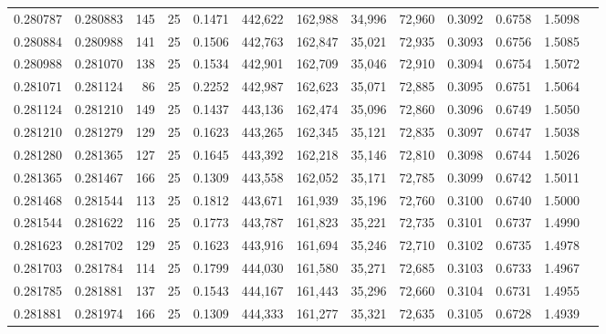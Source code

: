 \begin{tabular}{rrrrrrrrrrrrr}
0.280787 & 0.280883 &   145 &  25 &                                     0.1471 & 442,622 & 162,988 &  34,996 &  72,960 & 0.3092 & 0.6758 & 1.5098 \\
0.280884 & 0.280988 &   141 &  25 &                                     0.1506 & 442,763 & 162,847 &  35,021 &  72,935 & 0.3093 & 0.6756 & 1.5085 \\
0.280988 & 0.281070 &   138 &  25 &                                     0.1534 & 442,901 & 162,709 &  35,046 &  72,910 & 0.3094 & 0.6754 & 1.5072 \\
0.281071 & 0.281124 &    86 &  25 &                                     0.2252 & 442,987 & 162,623 &  35,071 &  72,885 & 0.3095 & 0.6751 & 1.5064 \\
0.281124 & 0.281210 &   149 &  25 &                                     0.1437 & 443,136 & 162,474 &  35,096 &  72,860 & 0.3096 & 0.6749 & 1.5050 \\
0.281210 & 0.281279 &   129 &  25 &                                     0.1623 & 443,265 & 162,345 &  35,121 &  72,835 & 0.3097 & 0.6747 & 1.5038 \\
0.281280 & 0.281365 &   127 &  25 &                                     0.1645 & 443,392 & 162,218 &  35,146 &  72,810 & 0.3098 & 0.6744 & 1.5026 \\
0.281365 & 0.281467 &   166 &  25 &                                     0.1309 & 443,558 & 162,052 &  35,171 &  72,785 & 0.3099 & 0.6742 & 1.5011 \\
0.281468 & 0.281544 &   113 &  25 &                                     0.1812 & 443,671 & 161,939 &  35,196 &  72,760 & 0.3100 & 0.6740 & 1.5000 \\
0.281544 & 0.281622 &   116 &  25 &                                     0.1773 & 443,787 & 161,823 &  35,221 &  72,735 & 0.3101 & 0.6737 & 1.4990 \\
0.281623 & 0.281702 &   129 &  25 &                                     0.1623 & 443,916 & 161,694 &  35,246 &  72,710 & 0.3102 & 0.6735 & 1.4978 \\
0.281703 & 0.281784 &   114 &  25 &                                     0.1799 & 444,030 & 161,580 &  35,271 &  72,685 & 0.3103 & 0.6733 & 1.4967 \\
0.281785 & 0.281881 &   137 &  25 &                                     0.1543 & 444,167 & 161,443 &  35,296 &  72,660 & 0.3104 & 0.6731 & 1.4955 \\
0.281881 & 0.281974 &   166 &  25 &                                     0.1309 & 444,333 & 161,277 &  35,321 &  72,635 & 0.3105 & 0.6728 & 1.4939 \\

\end{tabular}
